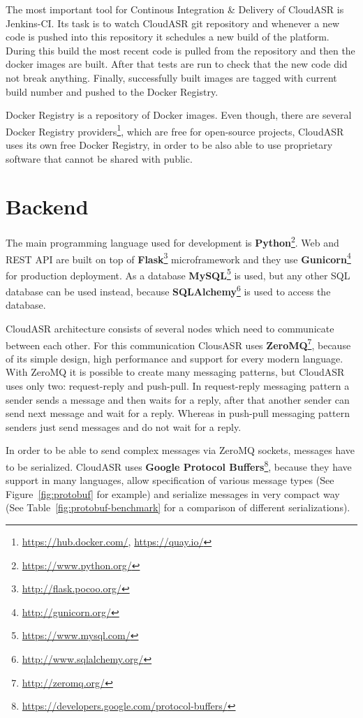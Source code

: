 The most important tool for Continous Integration \& Delivery of CloudASR is Jenkins-CI.
Its task is to watch CloudASR git repository
  and whenever a new code is pushed into this repository it schedules a new build of the platform.
During this build the most recent code is pulled from the repository and then the docker images are built.
After that tests are run to check that the new code did not break anything.
Finally, successfully built images are tagged with current build number and pushed to the Docker Registry.


Docker Registry is a repository of Docker images.
Even though, there are several Docker Registry providers\footnote{\url{https://hub.docker.com/}, \url{https://quay.io/}},
  which are free for open-source projects,
  CloudASR uses its own free Docker Registry,
  in order to be also able to use proprietary software that cannot be shared with public.


\section{Backend}
The main programming language used for development is \textbf{Python}\footnote{\url{https://www.python.org/}}.
Web and REST API are built on top of \textbf{Flask}\footnote{\url{http://flask.pocoo.org/}} microframework
  and they use \textbf{Gunicorn}\footnote{\url{http://gunicorn.org/}} for production deployment.
As a database \textbf{MySQL}\footnote{\url{https://www.mysql.com/}} is used,
  but any other SQL database can be used instead,
  because \textbf{SQLAlchemy}\footnote{\url{http://www.sqlalchemy.org/}} is used to access the database.

CloudASR architecture consists of several nodes which need to communicate between each other.
For this communication ClousASR uses \textbf{ZeroMQ}\footnote{\url{http://zeromq.org/}},
  because of its simple design, high performance and support for every modern language.
With ZeroMQ it is possible to create many messaging patterns,
  but CloudASR uses only two: request-reply and push-pull.
In request-reply messaging pattern a sender sends a message and then waits for a reply,
  after that another sender can send next message and wait for a reply.
Whereas in push-pull messaging pattern senders just send messages and do not wait for a reply.


In order to be able to send complex messages via ZeroMQ sockets, messages have to be serialized.
CloudASR uses \textbf{Google Protocol Buffers}\footnote{\url{https://developers.google.com/protocol-buffers/}},
  because they have support in many languages,
  allow specification of various message types (See Figure~\ref{fig:protobuf} for example)
  and serialize messages in very compact way
  (See Table~\ref{fig:protobuf-benchmark} for a comparison of different serializations).

